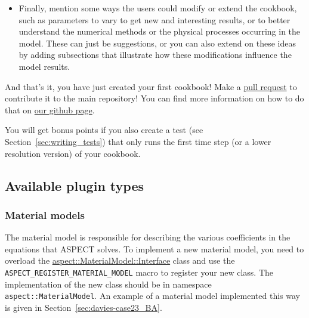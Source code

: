 \documentclass{article}
\newcommand{\aspect}{\textsc{ASPECT}}
\begin{document}
\begin{itemize}
  artifacts, because the rainbow color scale is not perceptually uniform. For more background on this topic,
  there is a great summary on \url{https://matplotlib.org/users/colormaps.html}.
  To state some of their recommendations here, in most cases it is best to choose a perceptually uniform color palette.
  For representing information that has ordering, they recommend sequential color palettes
  that change in lightness/color incrementally like ``viridis'', ``inferno'', ``plasma'' and ``magma''.
  For representing data that deviates around zero, they recommend diverging color palettes
  where two different colors change in lightness and meet at an unsaturated color in the middle
  such as ``BrBG'' and ``RdBu''.
  If you use a recent version of ParaView or VisIt, these color palettes are included with the preset
  color maps under the names given above, and you may want to choose one of these options rather than the default.
\item Finally, mention some ways the users could modify or extend the cookbook, such as
  parameters to vary to get new and interesting results, or to better understand
  the numerical methods or the physical processes occurring in the model. These can just be
  suggestions, or you can also extend on these ideas by adding subsections that illustrate
  how these modifications influence the model results.
\end{itemize}

And that's it, you have just created your first cookbook! Make a
\href{https://guides.github.com/introduction/flow/}{pull request} to contribute it to the
main repository! You can find more information on how to do that on
\href{https://github.com/geodynamics/aspect/blob/master/CONTRIBUTING.md}{our github page}.

You will get bonus points if you also create a test (see Section~\ref{sec:writing_tests}) that only runs the first time step
(or a lower resolution version) of your cookbook.

\subsection{Available plugin types}
\label{sec:plugins-concrete}

\subsubsection{Material models}
\label{sec:material-models}

The material model is responsible for describing the various coefficients in
the equations that \aspect{} solves. To implement a new material model, you
need to overload the \href{doc/doxygen/classaspect_1_1MaterialModel_1_1Interface.html}{aspect::MaterialModel::Interface} class and use
the \texttt{ASPECT\_REGISTER\_MATERIAL\_MODEL} macro to register your new
class. The implementation of the new class should be in namespace
\texttt{aspect::MaterialModel}. An example of a material model implemented
this way is given in Section~\ref{sec:davies-case23_BA}.
\end{document}
